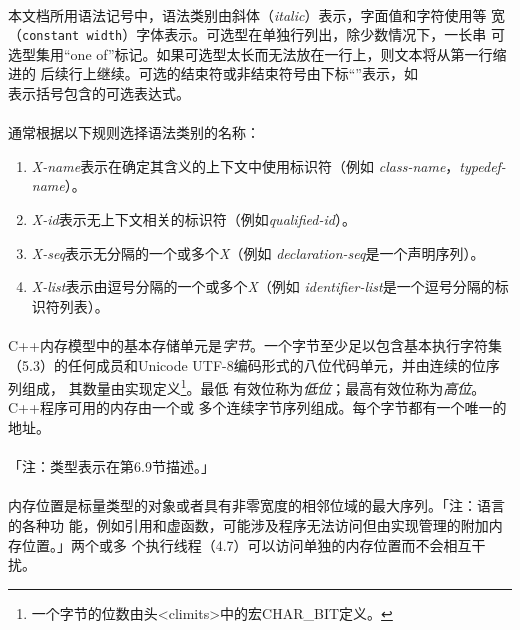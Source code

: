 \paragraph{}
本文档所用语法记号中，语法类别由斜体（\textit{italic}）表示，字面值和字符使用等
宽（\texttt{constant width}）字体表示。可选型在单独行列出，除少数情况下，一长串
可选型集用``one of''标记。如果可选型太长而无法放在一行上，则文本将从第一行缩进的
后续行上继续。可选的结束符或非结束符号由下标``\textit{}''表示，如 \\
表示括号包含的可选表达式。

\paragraph{}
通常根据以下规则选择语法类别的名称：
\begin{enumerate}
  \item \textit{X-name}表示在确定其含义的上下文中使用标识符（例如
    \textit{class-name}，\textit{typedef-name}）。
  \item \textit{X-id}表示无上下文相关的标识符（例如\textit{qualified-id}）。
  \item \textit{X-seq}表示无分隔的一个或多个\textit{X}（例如
    \textit{declaration-seq}是一个声明序列）。
  \item \textit{X-list}表示由逗号分隔的一个或多个\textit{X}（例如
    \textit{identifier-list}是一个逗号分隔的标识符列表）。
\end{enumerate}

\paragraph{}
C++内存模型中的基本存储单元是\textit{字节}。一个字节至少足以包含基本执行字符集
（5.3）的任何成员和Unicode UTF-8编码形式的八位代码单元，并由连续的位序列组成，
其数量由实现定义\footnote{一个字节的位数由头<climits>中的宏CHAR\_BIT定义。}。最低
有效位称为\textit{低位}；最高有效位称为\textit{高位}。C++程序可用的内存由一个或
多个连续字节序列组成。每个字节都有一个唯一的地址。

\paragraph{}
「注：类型表示在第6.9节描述。」

\paragraph{}
内存位置是标量类型的对象或者具有非零宽度的相邻位域的最大序列。「注：语言的各种功
能，例如引用和虚函数，可能涉及程序无法访问但由实现管理的附加内存位置。」两个或多
个执行线程（4.7）可以访问单独的内存位置而不会相互干扰。

